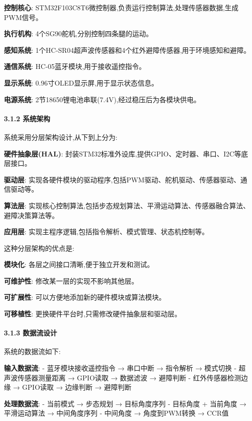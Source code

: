 \documentclass[
]{article}
\begin{document}
\textbf{控制核心}:
STM32F103C8T6微控制器,负责运行控制算法,处理传感器数据,生成PWM信号。

\textbf{执行机构}: 4个SG90舵机,分别控制四条腿的运动。

\textbf{感知系统}:
1个HC-SR04超声波传感器和4个红外避障传感器,用于环境感知和避障。

\textbf{通信系统}: HC-05蓝牙模块,用于接收遥控指令。

\textbf{显示系统}: 0.96寸OLED显示屏,用于显示状态信息。

\textbf{电源系统}: 2节18650锂电池串联(7.4V),经过稳压后为各模块供电。

\hypertarget{ux7cfbux7edfux67b6ux6784}{%
\paragraph{3.1.2 系统架构}\label{ux7cfbux7edfux67b6ux6784}}

系统采用分层架构设计,从下到上分为:

\textbf{硬件抽象层(HAL)}:
封装STM32标准外设库,提供GPIO、定时器、串口、I2C等底层接口。

\textbf{驱动层}:
实现各硬件模块的驱动程序,包括PWM驱动、舵机驱动、传感器驱动、通信驱动等。

\textbf{算法层}:
实现核心控制算法,包括步态规划算法、平滑运动算法、传感器融合算法、避障决策算法等。

\textbf{应用层}: 实现主程序逻辑,包括指令解析、模式管理、状态机控制等。

这种分层架构的优点是:

\textbf{模块化}: 各层之间接口清晰,便于独立开发和测试。

\textbf{可维护性}: 修改某一层的实现不影响其他层。

\textbf{可扩展性}: 可以方便地添加新的硬件模块或算法模块。

\textbf{可移植性}: 更换硬件平台时,只需修改硬件抽象层和驱动层。

\hypertarget{ux6570ux636eux6d41ux8bbeux8ba1}{%
\paragraph{3.1.3 数据流设计}\label{ux6570ux636eux6d41ux8bbeux8ba1}}

系统的数据流如下:

\textbf{输入数据流}: - 蓝牙模块接收遥控指令 → 串口中断 → 指令解析 →
模式切换 - 超声波传感器测量距离 → GPIO读取 → 数据滤波 → 避障判断 -
红外传感器检测边缘 → GPIO读取 → 边缘判断 → 避障判断

\textbf{处理数据流}: - 当前模式 → 步态规划 → 目标角度序列 - 目标角度 +
当前角度 → 平滑运动算法 → 中间角度序列 - 中间角度 → 角度到PWM转换 →
CCR值
\end{document}
